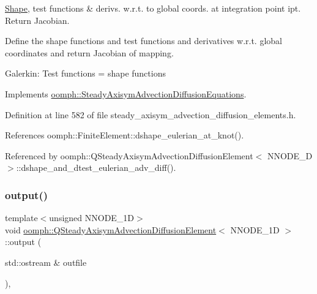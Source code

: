 \hyperlink{classoomph_1_1Shape}{Shape}, test functions \& derivs. w.\+r.\+t. to global coords. at integration point ipt. Return Jacobian. 

Define the shape functions and test functions and derivatives w.\+r.\+t. global coordinates and return Jacobian of mapping.

Galerkin\+: Test functions = shape functions 

Implements \hyperlink{classoomph_1_1SteadyAxisymAdvectionDiffusionEquations_a169cdaf88ac3dae29c77fba726346a0c}{oomph\+::\+Steady\+Axisym\+Advection\+Diffusion\+Equations}.



Definition at line 582 of file steady\+\_\+axisym\+\_\+advection\+\_\+diffusion\+\_\+elements.\+h.



References oomph\+::\+Finite\+Element\+::dshape\+\_\+eulerian\+\_\+at\+\_\+knot().



Referenced by oomph\+::\+Q\+Steady\+Axisym\+Advection\+Diffusion\+Element$<$ N\+N\+O\+D\+E\+\_\+D $>$\+::dshape\+\_\+and\+\_\+dtest\+\_\+eulerian\+\_\+adv\+\_\+diff().

\mbox{\label{classoomph_1_1QSteadyAxisymAdvectionDiffusionElement_acb9de208b63774c2ea96c1bcab916212}} 
\subsubsection{\texorpdfstring{output()}{output()}\hspace{0.1cm}{\footnotesize\ttfamily [1/4]}}
{\footnotesize\ttfamily template$<$unsigned N\+N\+O\+D\+E\+\_\+1D$>$ \\
void \hyperlink{classoomph_1_1QSteadyAxisymAdvectionDiffusionElement}{oomph\+::\+Q\+Steady\+Axisym\+Advection\+Diffusion\+Element}$<$ N\+N\+O\+D\+E\+\_\+1D $>$\+::output (\begin{DoxyParamCaption}\item[{std\+::ostream \&}]{outfile }\end{DoxyParamCaption})\hspace{0.3cm}{\ttfamily [inline]}, {\ttfamily [virtual]}}



